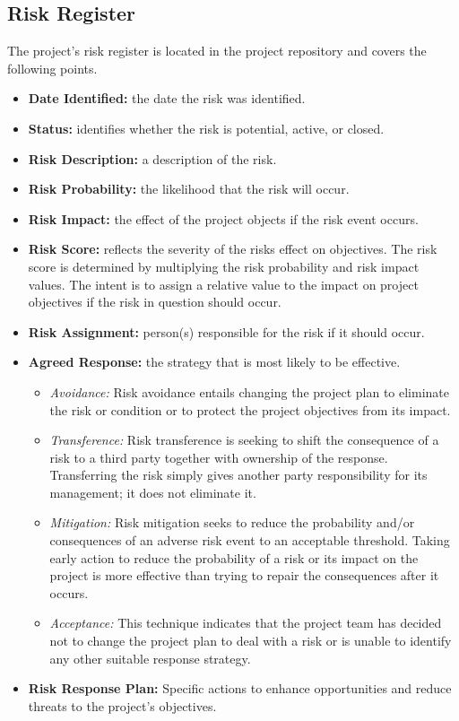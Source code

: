 \documentclass[a4paper, 11pt]{article}
\begin{document}
\subsection{Risk Register}
The project's risk register is located in the project repository and covers the following points.
\begin{itemize}
	\item \textbf{Date Identified:} the date the risk was identified.
	\item \textbf{Status:} identifies whether the risk is potential, active, or closed.
	\item \textbf{Risk Description:} a description of the risk.
	\item \textbf{Risk Probability:} the likelihood that the risk will occur.
	\item \textbf{Risk Impact:} the effect of the project objects if the risk event occurs.
	\item \textbf{Risk Score:} reflects the severity of the risks effect on objectives. The risk score is determined by multiplying the risk probability and risk impact values. The intent is to assign a relative value to the impact on project objectives if the risk in question should occur.
	\item \textbf{Risk Assignment:} person(s) responsible for the risk if it should occur.
	\item \textbf{Agreed Response:} the strategy that is most likely to be effective.
	\begin{itemize}
		\item \textit{Avoidance:} Risk avoidance entails changing the project plan to eliminate the risk or condition or to protect the project objectives from its impact.
		\item \textit{Transference:} Risk transference is seeking to shift the consequence of a risk to a third party together with ownership of the response. Transferring the risk simply gives another party responsibility for its management; it does not eliminate it.
		\item \textit{Mitigation:} Risk mitigation seeks to reduce the probability and/or consequences of an adverse risk event to an acceptable threshold. Taking early action to reduce the probability of a risk or its impact on the project is more effective than trying to repair the	consequences after it occurs.
		\item \textit{Acceptance:} This technique indicates that the project team has decided not to change the project plan to deal with a risk or is unable to identify any other suitable response strategy.
	\end{itemize}
	\item \textbf{Risk Response Plan:} Specific actions to enhance opportunities and reduce threats to the project's objectives.
\end{itemize}
\end{document}
